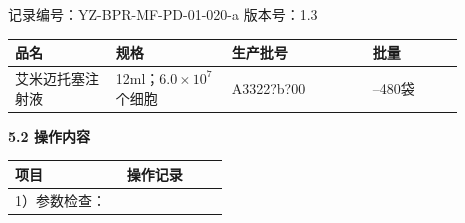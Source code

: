 \documentclass[UTF8,10pt,a4paper,fontset=fandol]{ctexart}
\newcommand{\fieldvalue}[1]{#1}
\newcommand{\handwritten}[1]{#1}
\begin{document}
\noindent
记录编号：YZ-BPR-MF-PD-01-020-a\hfill
版本号：1.3

\begin{tabular}{|p{0.20\linewidth}|p{0.23\linewidth}|p{0.28\linewidth}|p{0.18\linewidth}|}
\hline
\centering 品名 & \centering 规格 & \centering 生产批号 & \centering 批量\\
\hline
\centering 艾米迈托塞注射液 &
\centering 12ml；$6.0\times10^{7}$个细胞 &
\centering
\fieldvalue{\handwritten{A3322?b?00}} &
\centering 200--480袋\\
\hline
\end{tabular}

\medskip
\noindent\textbf{5.2 操作内容}

\begin{tabular}{|p{0.49\linewidth}|p{0.45\linewidth}|}
\hline
\centering 项目 & \centering 操作记录\\
\hline
\begin{minipage}[t]{0.46\linewidth}
1）参数检查：


\end{minipage}
\end{tabular}
\end{document}
